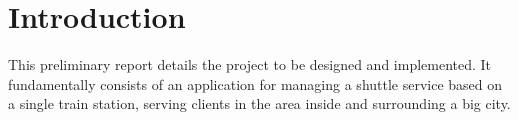 \chapter{Introduction}
This preliminary report details the project to be designed and implemented.
It fundamentally consists of an application for managing a shuttle service based on a single train station, serving clients in the area inside and surrounding a big city.
